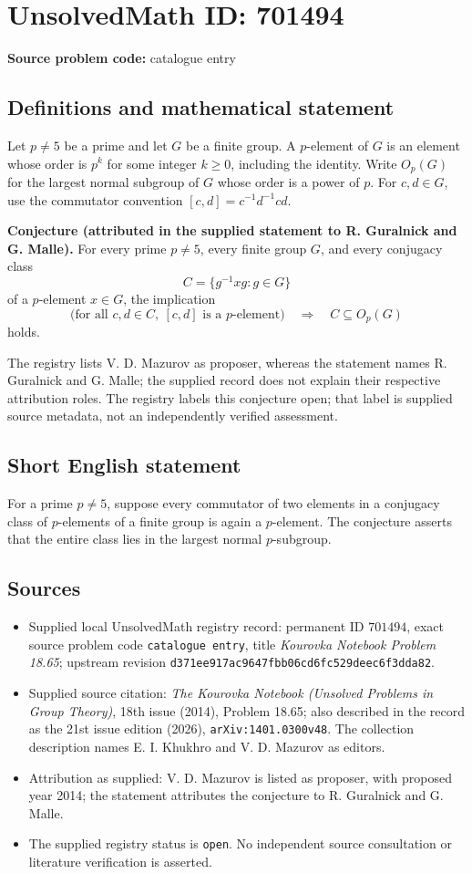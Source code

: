 \documentclass[11pt]{article}
\begin{document}
\section*{UnsolvedMath ID: 701494}
\textbf{Source problem code:} catalogue entry
\subsection{Definitions and mathematical statement}
Let \(p\ne 5\) be a prime and let \(G\) be a finite group. A \(p\)-element of \(G\) is an element whose order is \(p^k\) for some integer \(k\ge 0\), including the identity. Write \(O_p(G)\) for the largest normal subgroup of \(G\) whose order is a power of \(p\). For \(c,d\in G\), use the commutator convention \([c,d]=c^{-1}d^{-1}cd\).

\textbf{Conjecture (attributed in the supplied statement to R. Guralnick and G. Malle).} For every prime \(p\ne 5\), every finite group \(G\), and every conjugacy class
\[
C=\{g^{-1}xg:g\in G\}
\]
of a \(p\)-element \(x\in G\), the implication
\[
\bigl(\text{for all }c,d\in C,\ [c,d]\text{ is a }p\text{-element}\bigr)
\quad\Longrightarrow\quad C\subseteq O_p(G)
\]
holds.

The registry lists V. D. Mazurov as proposer, whereas the statement names R. Guralnick and G. Malle; the supplied record does not explain their respective attribution roles. The registry labels this conjecture open; that label is supplied source metadata, not an independently verified assessment.
\subsection{Short English statement}
For a prime \(p\ne 5\), suppose every commutator of two elements in a conjugacy class of \(p\)-elements of a finite group is again a \(p\)-element. The conjecture asserts that the entire class lies in the largest normal \(p\)-subgroup.
\subsection{Sources}
\begin{itemize}
\item Supplied local UnsolvedMath registry record: permanent ID \(701494\), exact source problem code \texttt{catalogue entry}, title \emph{Kourovka Notebook Problem 18.65}; upstream revision \texttt{d371ee917ac9647fbb06cd6fc529deec6f3dda82}.
\item Supplied source citation: \emph{The Kourovka Notebook (Unsolved Problems in Group Theory)}, 18th issue (2014), Problem 18.65; also described in the record as the 21st issue edition (2026), \texttt{arXiv:1401.0300v48}. The collection description names E. I. Khukhro and V. D. Mazurov as editors.
\item Attribution as supplied: V. D. Mazurov is listed as proposer, with proposed year 2014; the statement attributes the conjecture to R. Guralnick and G. Malle.
\item The supplied registry status is \texttt{open}. No independent source consultation or literature verification is asserted.
\end{itemize}
\end{document}

